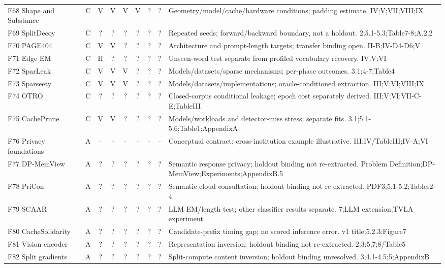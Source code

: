 \begin{table}[p]
\begin{tabularx}{\textwidth}{@{}p{}cccccccY@{}}
F68 Shape and Substance~\cite{hadad2026shape} & C & V & V & V & V & ? & ? & Geometry/model/cache/hardware conditions; padding estimate. IV;V;VII;VIII;IX\\
F69 SplitDecoy~\cite{politis2026splitdecoy} & C & ? & ? & ? & ? & ? & ? & Repeated seeds; forward/backward boundary, not a holdout. 2;5.1-5.3;Table7-8;A.2.2\\
F70 PAGE404~\cite{nazaraliyev2026page404} & C & V & V & ? & ? & ? & ? & Architecture and prompt-length targets; transfer binding open. II-B;IV-D4-D6;V\\
F71 Edge EM~\cite{alhalawani2026physicaledge} & C & H & ? & ? & ? & ? & ? & Unseen-word test separate from profiled vocabulary recovery. IV;V;VI\\
F72 SparLeak~\cite{chen2026sparleak} & C & V & V & V & ? & ? & ? & Models/datasets/sparse mechanisms; per-phase outcomes. 3.1;4-7;Table4\\
F73 Sparseety~\cite{jo2026sparseety} & C & V & V & V & ? & ? & ? & Models/datasets/implementations; oracle-conditioned extraction. III;V;VI;VIII;IX\\
F74 OTRO~\cite{lee2026otro} & C & ? & ? & ? & ? & ? & ? & Closed-corpus conditional leakage; epoch cost separately derived. III;V;VI;VII-C-E;TableIII\\
F75 CachePrune~\cite{wu2026cacheprune} & C & V & V & ? & ? & ? & ? & Models/workloads and detector-miss stress; separate fits. 3.1;5.1-5.6;Table1;AppendixA\\
F76 Privacy foundations~\cite{kotevska2026privacyfoundations} & A & - & - & - & - & - & - & Conceptual contract; cross-institution example illustrative. III;IV/TableIII;IV-A;VI\\
F77 DP-MemView~\cite{dpmemview2026} & A & ? & ? & ? & ? & ? & ? & Semantic response privacy; holdout binding not re-extracted. Problem Definition;DP-MemView;Experiments;AppendixB.5\\
F78 PriCon~\cite{pricon2026} & A & ? & ? & ? & ? & ? & ? & Semantic cloud consultation; holdout binding not re-extracted. PDF3;5.1-5.2;Tables2-4\\
F79 SCAAR~\cite{mondol2025scaar} & A & ? & ? & ? & ? & ? & ? & LLM EM/length test; other classifier results separate. 7;LLM extension;TVLA experiment\\
F80 CacheSolidarity~\cite{pennas2026cachesolidarity} & A & ? & ? & ? & ? & ? & ? & Candidate-prefix timing gap; no scored inference error. v1 title;5.2.3;Figure7\\
F81 Vision encoder~\cite{zhou2026visionencoder} & A & ? & ? & ? & ? & ? & ? & Representation inversion; holdout binding not re-extracted. 2;3;5;7;8/Table5\\
F82 Split gradients~\cite{politis2026gradients} & A & ? & ? & ? & ? & ? & ? & Split-compute content inversion; holdout binding unresolved. 3;4.1-4.5;5;AppendixB\\
\bottomrule\end{tabularx}\end{table}
